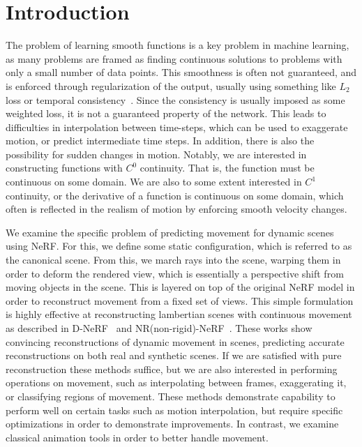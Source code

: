\section*{Introduction}

The problem of learning smooth functions is a key problem in machine learning, as many problems
are framed as finding continuous solutions to problems with only a small number of data points.
This smoothness is often not guaranteed, and is enforced through regularization of the output,
usually using something like $L_2$ loss or temporal consistency~\cite{tretschk2021nonrigid}. Since
the consistency is usually imposed as some weighted loss, it is not a guaranteed property of the
network. This leads to difficulties in interpolation between time-steps, which can be used to
exaggerate motion, or predict intermediate time steps. In addition, there is also the
possibility for sudden changes in motion.
Notably, we are interested in constructing functions with $C^0$ continuity. That is, the
function must be continuous on some domain. We are also to some extent interested in $C^1$
continuity, or the derivative of a function is continuous on some domain, which often is
reflected in the realism of motion by enforcing smooth velocity changes.

We examine the specific problem of predicting movement for dynamic scenes using NeRF. For this,
we define some static configuration, which is referred to as the canonical scene. From this, we
march rays into the scene, warping them in order to deform the rendered view, which is
essentially a perspective shift from moving objects in the scene. This is layered on top of the
original NeRF model in order to reconstruct movement from a fixed set of views. This simple
formulation is highly effective at reconstructing lambertian scenes with continuous movement as
described in D-NeRF~\cite{pumarola2020dnerf} and NR(non-rigid)-NeRF~\cite{tretschk2021nonrigid}. These works show convincing
reconstructions of dynamic movement in scenes, predicting accurate reconstructions on both real
and synthetic scenes. If we are satisfied with pure reconstruction these methods suffice, but we
are also interested in performing operations on movement, such as interpolating between frames,
exaggerating it, or classifying regions of movement. These methods demonstrate capability to
perform well on certain tasks such as motion interpolation, but require specific optimizations
in order to demonstrate improvements. In contrast, we examine classical animation tools in order
to better handle movement.

